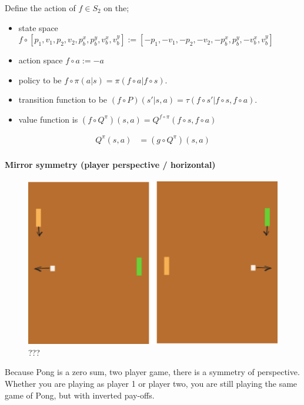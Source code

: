 Define the action of $f \in S_2$ on the;

\begin{itemize}
	\tightlist
	\item state space $f \circ [p_1, v_1, p_2, v_2, p^x_b, p^y_b, v^x_b, v^y_b] := [-p_1, -v_1, -p_2, -v_2, -p^x_b, p^y_b, -v^x_b, v^y_b]$
	\item action space $f \circ a := -a$
 	\item policy to be $f \circ \pi(a | s) = \pi(f \circ a | f \circ s)$.
	\item transition function to be $(f \circ P)(s' | s, a) = \tau(f \circ s'| f \circ s, f \circ a)$.
	\item value function is $(f \circ Q^{\pi})(s, a) = Q^{f \circ \pi}(f \circ s, f \circ a)$
\end{itemize}

\begin{align*}
Q^\pi(s, a) &= (g \circ Q^{\pi})(s, a) \tag{expected return}
\end{align*}


\paragraph{Mirror symmetry (player perspective / horizontal)}

\begin{figure}
\centering
\includegraphics[width=1\textwidth,height=0.25\textheight]{../../pictures/drawings/pong-horz-flip.png}
\caption{???}
\end{figure}

Because Pong is a zero sum, two player game, there is a symmetry of perspective.
Whether you are playing as player 1 or player two, you are still playing the same game of Pong,
but with inverted pay-offs.

